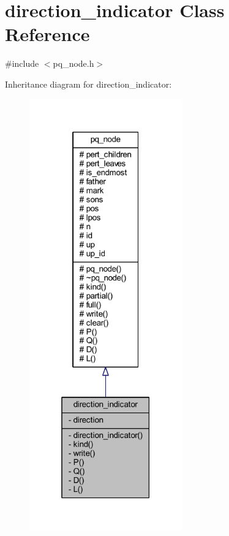 \hypertarget{classdirection__indicator}{}\section{direction\+\_\+indicator Class Reference}
\label{classdirection__indicator}


{\ttfamily \#include $<$pq\+\_\+node.\+h$>$}



Inheritance diagram for direction\+\_\+indicator\+:\nopagebreak
\begin{figure}[H]
\begin{center}
\leavevmode
\includegraphics[width=187pt]{classdirection__indicator__inherit__graph}
\end{center}
\end{figure}


